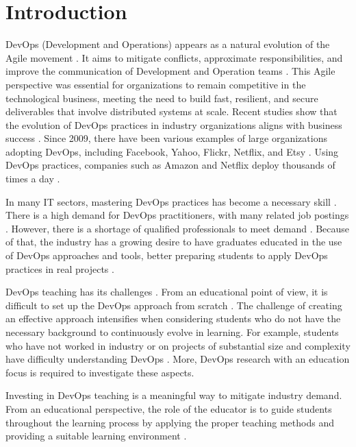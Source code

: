 \documentclass[10pt,conference]{IEEEtran}
\begin{document}
\section{Introduction}



DevOps (Development and Operations) appears as a natural evolution
of the Agile movement \cite{almeida:2022, bobrov:2020}. It aims to mitigate conflicts, approximate responsibilities, and improve the communication of Development and Operation teams
\cite{ieee:2021, bahadori:2018, rodrigues:2017, ebert:2016}. This Agile perspective was essential for organizations to remain competitive in the technological business, meeting the need to build fast, resilient, and secure deliverables that involve distributed systems at scale. Recent studies show that the evolution of DevOps practices in industry organizations aligns with business success \cite{forsgren:2018}. Since 2009, there have been various examples of large organizations adopting DevOps, including Facebook, Yahoo, Flickr, Netflix, and Etsy \cite{rong:2017, erich:2017, bang:2013}. Using DevOps practices, companies such as Amazon and Netflix deploy thousands of times a day \cite{agarwal:2018}.

In many IT sectors, mastering DevOps practices has become a necessary skill \cite{wiesche:2018, spinellis:2016}. There is a high demand for DevOps practitioners, with many related job postings \cite{pang:2020}. However, there is a shortage of qualified professionals to meet demand \cite{ferino:2021, krusche:2014}. Because of that, the industry has a growing desire to have graduates educated in the use of DevOps approaches and tools, better preparing students to apply DevOps practices in real projects \cite{jennings:2019, bobrov:2019}.


DevOps teaching has its challenges \cite{christensen:2016}.  From an educational point of view, it is difficult to set up the DevOps approach from scratch \cite{ferino:2021, bobrov:2019}. The challenge of creating an effective approach intensifies when considering students who do not have the necessary background to continuously evolve in learning. For example, students who have not worked in industry or on projects of substantial size and complexity have difficulty understanding DevOps \cite{jones:2018, perez:2021}. More, DevOps research with an education focus is required to investigate these aspects.

Investing in DevOps teaching is a meaningful way to mitigate industry demand. From an educational perspective, the role of the educator is to guide students throughout the learning process by applying the proper teaching methods and providing a suitable learning environment \cite{kilamo:2012}.
\end{document}
